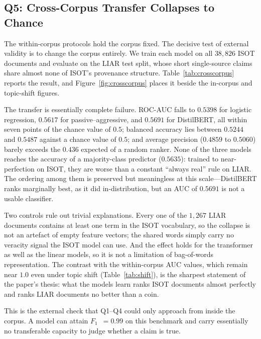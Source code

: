 \documentclass[conference]{IEEEtran}
\newcommand{\Fone}{$F_1$}
\begin{document}
\subsection{Q5: Cross-Corpus Transfer Collapses to Chance}
\label{sec:results-crosscorpus}
The within-corpus protocols hold the corpus fixed. The decisive test of external
validity is to change the corpus entirely. We train each model on all
$38{,}826$ ISOT documents and evaluate on the LIAR test split, whose short
single-source claims share almost none of ISOT's provenance structure.
Table~\ref{tab:crosscorpus} reports the result, and Figure~\ref{fig:crosscorpus}
places it beside the in-corpus and topic-shift figures.

The transfer is essentially complete failure. ROC-AUC falls to $0.5398$ for
logistic regression, $0.5617$ for passive--aggressive, and $0.5691$ for
DistilBERT, all within seven points of the chance value of $0.5$; balanced
accuracy lies between $0.5244$ and $0.5487$ against a chance value of $0.5$; and
average precision ($0.4859$ to $0.5060$) barely exceeds the $0.436$ expected of a
random ranker. None of the three models reaches the accuracy of a majority-class
predictor ($0.5635$): trained to near-perfection on ISOT, they are worse than a
constant ``always real'' rule on LIAR. The ordering among them is preserved but
meaningless at this scale---DistilBERT ranks marginally best, as it did
in-distribution, but an AUC of $0.5691$ is not a usable classifier.

Two controls rule out trivial explanations. Every one of the $1{,}267$ LIAR
documents contains at least one term in the ISOT vocabulary, so the collapse is
not an artefact of empty feature vectors; the shared words simply carry no
veracity signal the ISOT model can use. And the effect holds for the transformer
as well as the linear models, so it is not a limitation of bag-of-words
representation. The contrast with the within-corpus AUC values, which remain
near $1.0$ even under topic shift (Table~\ref{tab:shift}), is the sharpest
statement of the paper's thesis: what the models learn ranks ISOT documents
almost perfectly and ranks LIAR documents no better than a coin.

This is the external check that Q1--Q4 could only approach from inside the
corpus. A model can attain \Fone{}~$=0.99$ on this benchmark and carry
essentially no transferable capacity to judge whether a claim is true.
\end{document}
